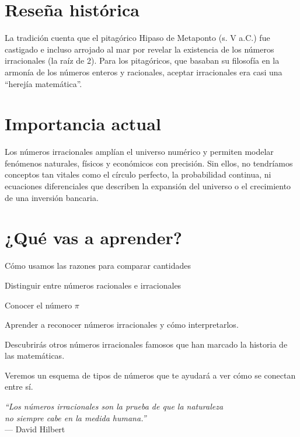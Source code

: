 
\vspace{0.5cm}

\vspace{1em}
\section*{Reseña histórica}

\begin{reseñaplana}
La tradición cuenta que el pitagórico Hipaso de Metaponto (s. V a.C.) fue castigado e incluso arrojado al 
mar por revelar la existencia de los números irracionales (la raíz de 2). Para los pitagóricos, que basaban su filosofía 
en la armonía de los números enteros y racionales, aceptar irracionales era casi una “herejía matemática”.
\end{reseñaplana}

\section*{Importancia actual}

\begin{reseñaplana}
Los números irracionales amplían el universo numérico y permiten modelar fenómenos naturales, 
físicos y económicos con precisión.  Sin ellos, no tendríamos conceptos tan vitales como el círculo perfecto, 
la probabilidad continua, ni ecuaciones diferenciales que describen la expansión del universo o el crecimiento de una inversión bancaria.
\end{reseñaplana}

\section*{¿Qué vas a aprender?}
\begin{aprende}
  \item Cómo usamos las razones para comparar cantidades
  \item Distinguir entre números racionales e irracionales
  \item Conocer el número $\pi$ 
  \item Aprender a reconocer números irracionales y cómo interpretarlos.
  \item Descubrirás otros números irracionales famosos que han marcado la historia de las matemáticas.
  \item Veremos un esquema de tipos de números que te ayudará a ver cómo se conectan entre sí.
\end{aprende}

\vspace{1.2cm}
\begin{flushright}
  {\oneptup\itshape ``Los números irracionales son la prueba de que la naturaleza\\ 
  no siempre cabe en la medida humana.''}\\
  {\oneptup — David Hilbert}
\end{flushright}












